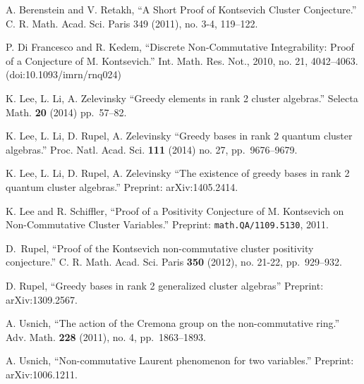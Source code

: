 \documentclass{amsart}
\begin{document}
 \begin{thebibliography}{xxx}

   A. Berenstein and V. Retakh, ``A Short Proof of Kontsevich Cluster Conjecture.''  C. R. Math. Acad. Sci. Paris 349 (2011), no. 3-4, 119–122.

   P. Di Francesco and R. Kedem, ``Discrete Non-Commutative Integrability: Proof of a Conjecture of M. Kontsevich.'' Int. Math. Res. Not.,  2010, no. 21, 4042–4063. (doi:10.1093/imrn/rnq024)

   K. Lee, L. Li, A. Zelevinsky ``Greedy elements in rank 2 cluster algebras.'' Selecta Math. \textbf{20} (2014) pp.~57--82.

   K. Lee, L. Li, D. Rupel, A. Zelevinsky ``Greedy bases in rank 2 quantum cluster algebras.'' Proc. Natl. Acad. Sci. \textbf{111} (2014) no. 27, pp.~9676--9679.

   K. Lee, L. Li, D. Rupel, A. Zelevinsky ``The existence of greedy bases in rank 2 quantum cluster algebras.'' Preprint: arXiv:1405.2414.

   K. Lee and R. Schiffler, ``Proof of a Positivity Conjecture of M. Kontsevich on Non-Commutative Cluster Variables.'' Preprint: \texttt{math.QA/1109.5130}, 2011.

   D.~Rupel, ``Proof of the Kontsevich non-commutative cluster positivity conjecture.'' C. R. Math. Acad. Sci. Paris \textbf{350} (2012), no. 21-22, pp.~929--932.

   D. Rupel, ``Greedy bases in rank 2 generalized cluster algebras'' Preprint: arXiv:1309.2567.

   A. Usnich, ``The action of the Cremona group on the non-commutative ring.'' Adv. Math. \textbf{228} (2011), no. 4, pp.~1863--1893.

   A. Usnich, ``Non-commutative Laurent phenomenon for two variables.'' Preprint: arXiv:1006.1211.

 \end{thebibliography}
\end{document}
